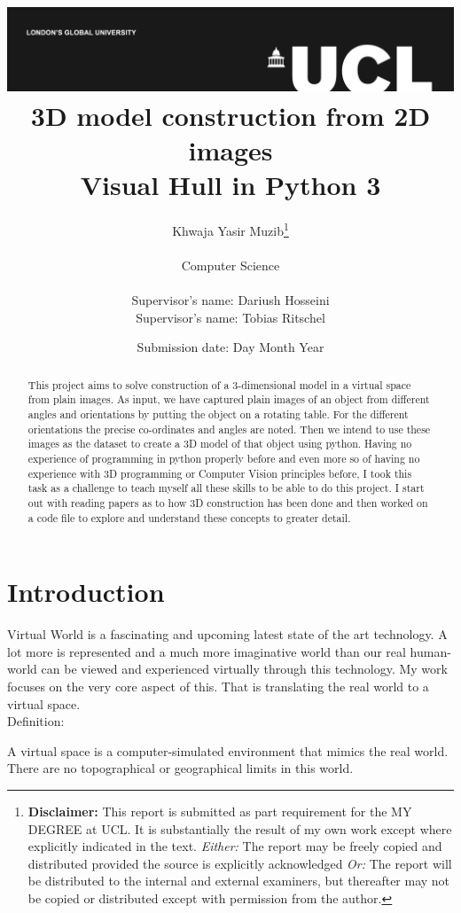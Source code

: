 \documentclass[a4paper]{report}
\title{{\vspace{-14em} \includegraphics[scale=0.4]{ucl_logo.png}}\\
{{\Huge 3D model construction from 2D images}}\\
{\large Visual Hull in Python 3}\\
}
\date{Submission date: Day Month Year}
\author{Khwaja Yasir Muzib\thanks{
{\bf Disclaimer:}
This report is submitted as part requirement for the MY DEGREE at UCL. It is
substantially the result of my own work except where explicitly indicated in the text.
\emph{Either:} The report may be freely copied and distributed provided the source is explicitly acknowledged
\newline  %
\emph{Or:}\newline
The report will be distributed to the internal and external examiners, but thereafter may not be copied or distributed except with permission from the author.}
\\ \\
Computer Science\\ \\
Supervisor's name: Dariush Hosseini \\
Supervisor's name: Tobias Ritschel}
\begin{document}
 
\onehalfspacing
\maketitle
\begin{abstract}
This project aims to solve construction of a 3-dimensional model in a virtual space from plain images. As input, we have captured plain images of an object  from different angles and orientations by putting the object on a rotating table. For the different orientations the precise co-ordinates and angles are noted. Then  we intend to use these images as the dataset to create a 3D model of that object using python. Having no experience of programming in python properly before and even more so of having no experience with 3D programming or Computer Vision principles before, I took this task as a challenge to teach myself all these skills to be able to do this project. I start out with reading papers as to how 3D construction has been done and then worked on a code file to explore and understand these concepts to greater detail.
\end{abstract}
\tableofcontents
\setcounter{page}{1}


\chapter{Introduction}
Virtual World is a fascinating and upcoming latest state of the art technology.
A lot more is represented and a much more imaginative world than our real human-world can be viewed and experienced virtually through this technology. My work focuses on the very core aspect of this. That is translating the real world to a virtual space.
\\
Definition:
\begin{center}
A virtual  space is a computer-simulated environment that mimics the real world. There are no topographical or geographical limits in this world.
\end{center}
\end{document}
